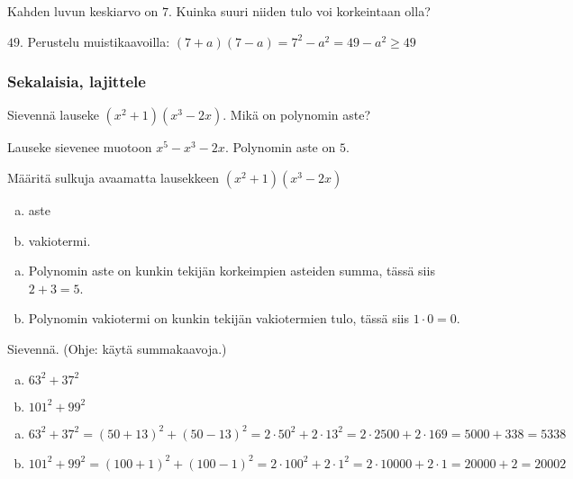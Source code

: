 \begin{tehtava} %
    Kahden luvun keskiarvo on $7$. Kuinka suuri niiden tulo voi korkeintaan olla?
    \begin{vastaus}
        $49$. Perustelu muistikaavoilla: $(7+a)(7-a)=7^2-a^2 = 49-a^2 \geq 49$
    \end{vastaus}
\end{tehtava}

\subsubsection*{Sekalaisia, lajittele}

\begin{tehtava}
    Sievennä lauseke $(x^2+1)(x^3-2x)$. Mikä on polynomin aste?
    \begin{vastaus}
        Lauseke sievenee muotoon $x^5-x^3-2x$. Polynomin aste on $5$.
    \end{vastaus}
\end{tehtava}

\begin{tehtava}
    Määritä sulkuja avaamatta lausekkeen $(x^2+1)(x^3-2x)$
    \begin{enumerate}[a)]
        \item aste
        \item vakiotermi.
    \end{enumerate}
    \begin{vastaus}
        \begin{enumerate}[a)]
            \item Polynomin aste on kunkin tekijän korkeimpien asteiden summa, tässä siis $2+3=5$.
            \item Polynomin vakiotermi on kunkin tekijän vakiotermien tulo, tässä siis $1\cdot 0=0$.
        \end{enumerate}
    \end{vastaus}
\end{tehtava}


\begin{tehtava}
    Sievennä. (Ohje: käytä summakaavoja.)
    \begin{enumerate}[a)]
        \item $63^2+37^2$
        \item $101^2+99^2$
    \end{enumerate}
    \begin{vastaus}
        \begin{enumerate}[a)]
            \item $63^2+37^2 = (50+13)^2+(50-13)^2 = 2\cdot 50^2 + 2\cdot 13^2 = 2\cdot 2500 +2\cdot 169 = 5000 + 338 = 5338$
            \item $101^2+99^2 = (100+1)^2+(100-1)^2 = 2\cdot 100^2 + 2\cdot 1^2 = 2\cdot 10000 + 2\cdot 1 = 20000 + 2 = 20002$
        \end{enumerate}
    \end{vastaus}
\end{tehtava}

